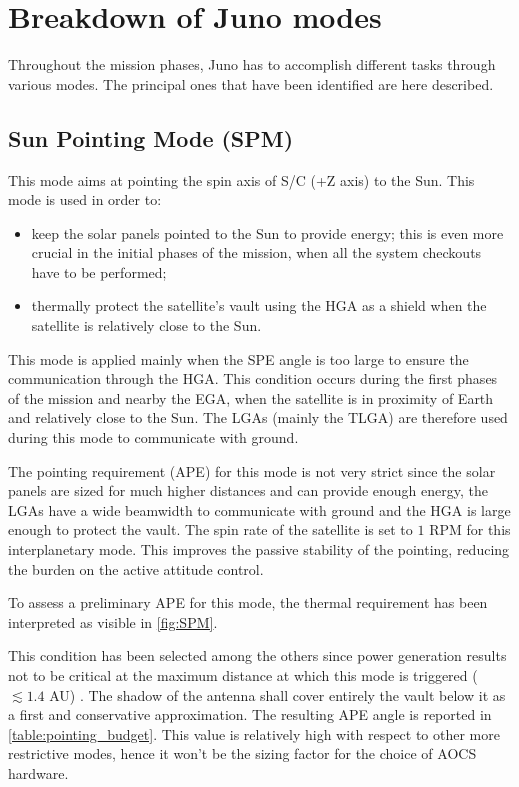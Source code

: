 \section{Breakdown of Juno modes}
\label{sec:AOCS_modes}

Throughout the mission phases, Juno has to accomplish different tasks through various modes. The principal ones that have been identified are here described.

\subsection{Sun Pointing Mode (SPM)}
\label{subsec:sun_pointing_mode}

This mode aims at pointing the spin axis of S/C (+Z axis) to the Sun. This mode is used in order to:
\begin{itemize}
    \item keep the solar panels pointed to the Sun to provide energy; this is even more crucial in the initial phases of the mission, when all the system checkouts have to be performed;
    \item thermally protect the satellite's vault using the HGA as a shield when the satellite is relatively close to the Sun.
\end{itemize}

This mode is applied mainly when the SPE angle is too large to ensure the communication through the HGA. This condition occurs during the first phases of the mission and nearby the EGA, when the satellite is in proximity of Earth and relatively close to the Sun. The LGAs (mainly the TLGA) are therefore used during this mode to communicate with ground.

The pointing requirement (APE) for this mode is not very strict since the solar panels are sized for much higher distances and can provide enough energy, the LGAs have a wide beamwidth to communicate with ground and the HGA is large enough to protect the vault.
The spin rate of the satellite is set to $1$ RPM for this interplanetary mode. This improves the passive stability of the pointing, reducing the burden on the active attitude control.

To assess a preliminary APE for this mode, the thermal requirement has been interpreted as visible in \autoref{fig:SPM}.

This condition has been selected among the others since power generation results not to be critical at the maximum distance at which this mode is triggered ($\lesssim 1.4$ AU) \cite{kurth}.
The shadow of the antenna shall cover entirely the vault below it as a first and conservative approximation.
The resulting APE angle is reported in \autoref{table:pointing_budget}.
This value is relatively high with respect to other more restrictive modes, hence it won't be the sizing factor for the choice of AOCS hardware.

